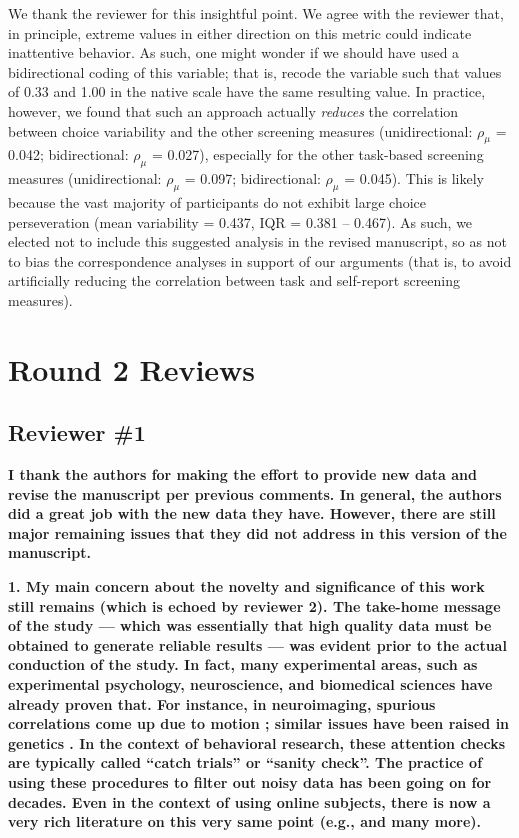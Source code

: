 \documentclass[a4paper,notitlepage,12pt]{article}
\begin{document}
We thank the reviewer for this insightful point. We agree with the reviewer that, in principle, extreme values in either direction on this metric could indicate inattentive behavior. As such, one might wonder if we should have used a bidirectional coding of this variable; that is, recode the variable such that values of 0.33 and 1.00 in the native scale have the same resulting value. In practice, however, we found that such an approach actually \textit{reduces} the correlation between choice variability and the other screening measures (unidirectional: $\rho_\mu$ = 0.042; bidirectional: $\rho_\mu$ = 0.027), especially for the other task-based screening measures (unidirectional: $\rho_\mu$ = 0.097; bidirectional: $\rho_\mu$ = 0.045). This is likely because the vast majority of participants do not exhibit large choice perseveration (mean variability = 0.437, IQR = 0.381 -- 0.467). As such, we elected not to include this suggested analysis in the revised manuscript, so as not to bias the correspondence analyses in support of our arguments (that is, to avoid artificially reducing the correlation between task and self-report screening measures). 

\section*{Round 2 Reviews}

\subsection*{Reviewer \#1}

\textbf{I thank the authors for making the effort to provide new data and revise the manuscript per previous comments. In general, the authors did a great job with the new data they have. However, there are still major remaining issues that they did not address in this version of the manuscript.}

\textbf{1. My main concern about the novelty and significance of this work still remains (which is echoed by reviewer 2). The take-home message of the study --- which was essentially that high quality data must be obtained to generate reliable results --- was evident prior to the actual conduction of the study. In fact, many experimental areas, such as experimental psychology, neuroscience, and biomedical sciences have already proven that. For instance, in neuroimaging, spurious correlations come up due to motion \cite{murphy2013resting, fellner2016spurious}; similar issues have been raised in genetics \cite{sullivan2007spurious}. In the context of behavioral research, these attention checks are typically called ``catch trials'' or ``sanity check''. The practice of using these procedures to filter out noisy data has been going on for decades. Even in the context of using online subjects, there is now a very rich literature on this very same point (e.g., \cite{barends2019noncompliant, chandler2019online} and many more).}
\end{document}
